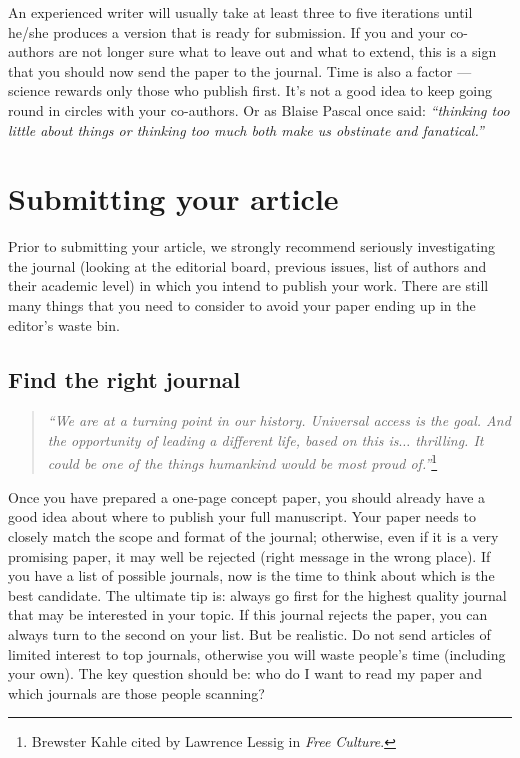 \documentclass[graybox,envcountchap,sectrefs,UStrade]{svmono}
\begin{document}
An experienced writer will usually take at least three to five iterations until he/she produces a version that is ready for submission. If you and your co-authors are not longer sure what to leave out and what to extend, this is a sign that you should now send the paper to the journal. Time is also a factor --- science rewards only those who publish first. It's not a good idea to keep going round in circles with your co-authors. Or as Blaise Pascal once said: \emph{``thinking too little about things or thinking too much both make us obstinate and fanatical.''}\par



\chapter{Submitting your article}\label{sec:submitting}


Prior to submitting your article, we strongly recommend seriously investigating the journal (looking at the editorial board, previous issues, list of authors and their academic level) in which you intend to publish your work. There are still many things that you need to consider to avoid your paper ending up in the editor's waste bin.\par

 \section{Find the right journal}

\begin{quote}
    \emph{``We are at a turning point in our history. Universal access is the goal. And the opportunity of leading a different life, based on this is$\ldots$ thrilling. It could be one of the things humankind would be most proud of.''}\footnote{Brewster Kahle cited by Lawrence Lessig in \emph{Free Culture}.}
\end{quote}

Once you have prepared a one-page concept paper, you should already have a good idea about where to publish your full manuscript. Your paper needs to closely match the scope and format of the journal; otherwise, even if it is a very promising paper, it may well be rejected (right message in the wrong place). If you have a list of possible journals, now is the time to think about which is the best candidate. The ultimate tip is: always go first for the highest quality journal that may be interested in your topic. If this journal rejects the paper, you can always turn to the second on your list. But be realistic. Do not send articles of limited interest to top journals, otherwise you will waste people's time (including your own). The key question should be: who do I want to read my paper and which journals are those people scanning?\par
\end{document}
